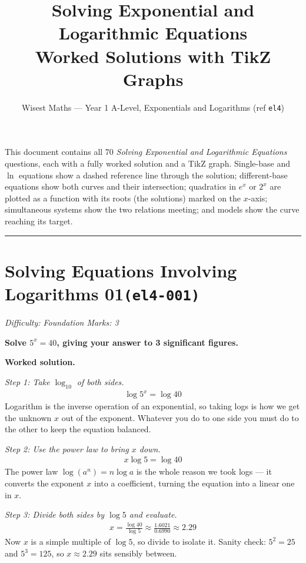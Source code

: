 \documentclass[11pt]{article}
\title{\textbf{Solving Exponential and Logarithmic Equations}\\[0.3em]\large Worked Solutions with TikZ Graphs}
\author{Wisest Maths --- Year 1 A-Level, Exponentials and Logarithms (ref \texttt{el4})}
\date{}
\newcommand{\question}[1]{\par\medskip\noindent\textbf{#1}\par}
\begin{document}
\maketitle
\noindent This document contains all 70 \emph{Solving Exponential and Logarithmic Equations}
questions, each with a fully worked solution and a TikZ graph. Single-base and \(\ln\) equations show a dashed
reference line through the solution; different-base equations show both curves and their intersection;
quadratics in \(e^x\) or \(2^x\) are plotted as a function with its roots (the solutions) marked on the
\(x\)-axis; simultaneous systems show the two relations meeting; and models show the curve reaching its target.
\tableofcontents
\bigskip
\hrule

\section*{Solving Equations Involving Logarithms 01\quad\small\texttt{(el4-001)}}
\textit{Difficulty: Foundation \quad\textbar\quad Marks: 3}

\question{Solve \( 5^x = 40 \), giving your answer to 3 significant figures.}

\textbf{Worked solution.}

\textit{Step 1: Take \( \log_{10} \) of both sides.}
\[\begin{gathered}
\log 5^x = \log 40
\end{gathered}\]
Logarithm is the inverse operation of an exponential, so taking logs is how we get the unknown \( x \) out of the exponent. Whatever you do to one side you must do to the other to keep the equation balanced.

\textit{Step 2: Use the power law to bring \( x \) down.}
\[\begin{gathered}
x \log 5 = \log 40
\end{gathered}\]
The power law \( \log(a^n) = n\log a \) is the whole reason we took logs --- it converts the exponent \( x \) into a coefficient, turning the equation into a linear one in \( x \).

\textit{Step 3: Divide both sides by \( \log 5 \) and evaluate.}
\[\begin{gathered}
x = \frac{\log 40}{\log 5} \approx \frac{1.6021}{0.6990} \approx 2.29
\end{gathered}\]
Now \( x \) is a simple multiple of \( \log 5 \), so divide to isolate it. Sanity check: \( 5^2 = 25 \) and \( 5^3 = 125 \), so \( x \approx 2.29 \) sits sensibly between.
\end{document}
